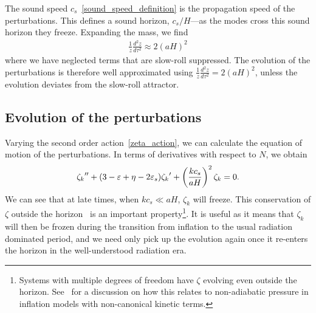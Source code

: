     The sound speed $c_s$~\eqref{sound_speed_definition} is
    the propagation speed of the perturbations.
    This defines a sound horizon, $c_s/H$---as the modes cross this sound
    horizon they freeze.
    Expanding the mass, we find
    \begin{align}
        \frac{1}{z}\frac{d^2z}{d\tau^2} \approx 2{\left(aH\right)}^2
    \end{align}
    where we have neglected terms that are slow-roll suppressed.
    The evolution of the perturbations is therefore well approximated using
    $\frac{1}{z}\frac{d^2z}{d\tau^2} = 2{\left(aH\right)}^2$,
    unless the evolution deviates from the slow-roll attractor.

    \subsection{Evolution of the perturbations}\label{pert_evol}
    Varying the second order action~\eqref{zeta_action}, we can calculate the equation of motion
    of the perturbations.
    In terms of derivatives with respect to $N$, we obtain
    \begin{align}\label{modefneqn_zeta_N}
        {\zeta_k}'' + (3-\varepsilon+\eta-2\varepsilon_{s}){\zeta_k}'+\left(\frac{kc_s}{aH}\right)^2\zeta_k=0.
    \end{align}
    We can see that at late times, when $kc_s\ll aH$, $\zeta_k$ will freeze.
    This conservation of $\zeta$ outside the horizon~\cite{Lyth_conserved} is an
    important property\footnote{
    Systems with multiple degrees of freedom have $\zeta$ evolving even outside
    the horizon. See~\cite{Christopherson_2009} for a discussion on how this relates
    to non-adiabatic pressure in inflation models with non-canonical kinetic terms.}.
    It is useful as it means that $\zeta_k$ will then be frozen during the transition from inflation to the
    usual radiation dominated period, and we need only pick up the evolution again once it
    re-enters the horizon in the well-understood radiation era.


